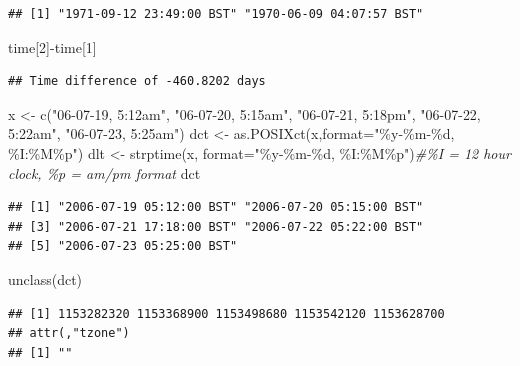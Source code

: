 \documentclass[]{article}
\newenvironment{Shaded}{\begin{snugshade}}{\end{snugshade}}
\newcommand{\AttributeTok}[1]{\textcolor[rgb]{0.77,0.63,0.00}{#1}}
\newcommand{\CommentTok}[1]{\textcolor[rgb]{0.56,0.35,0.01}{\textit{#1}}}
\newcommand{\DecValTok}[1]{\textcolor[rgb]{0.00,0.00,0.81}{#1}}
\newcommand{\FunctionTok}[1]{\textcolor[rgb]{0.00,0.00,0.00}{#1}}
\newcommand{\NormalTok}[1]{#1}
\newcommand{\OtherTok}[1]{\textcolor[rgb]{0.56,0.35,0.01}{#1}}
\newcommand{\SpecialCharTok}[1]{\textcolor[rgb]{0.00,0.00,0.00}{#1}}
\newcommand{\StringTok}[1]{\textcolor[rgb]{0.31,0.60,0.02}{#1}}
\begin{document}
\begin{verbatim}
## [1] "1971-09-12 23:49:00 BST" "1970-06-09 04:07:57 BST"
\end{verbatim}

\begin{Shaded}
\begin{Highlighting}[]
\NormalTok{time[}\DecValTok{2}\NormalTok{]}\SpecialCharTok{{-}}\NormalTok{time[}\DecValTok{1}\NormalTok{]}
\end{Highlighting}
\end{Shaded}

\begin{verbatim}
## Time difference of -460.8202 days
\end{verbatim}

\begin{Shaded}
\begin{Highlighting}[]
\NormalTok{x }\OtherTok{\textless{}{-}} \FunctionTok{c}\NormalTok{(}\StringTok{"06{-}07{-}19, 5:12am"}\NormalTok{, }\StringTok{"06{-}07{-}20, 5:15am"}\NormalTok{, }\StringTok{"06{-}07{-}21, 5:18pm"}\NormalTok{, }\StringTok{"06{-}07{-}22, 5:22am"}\NormalTok{,  }\StringTok{"06{-}07{-}23, 5:25am"}\NormalTok{)}
\NormalTok{dct }\OtherTok{\textless{}{-}} \FunctionTok{as.POSIXct}\NormalTok{(x,}\AttributeTok{format=}\StringTok{"\%y{-}\%m{-}\%d, \%I:\%M\%p"}\NormalTok{)}
\NormalTok{dlt }\OtherTok{\textless{}{-}} \FunctionTok{strptime}\NormalTok{(x, }\AttributeTok{format=}\StringTok{"\%y{-}\%m{-}\%d, \%I:\%M\%p"}\NormalTok{)}\CommentTok{\#\%I = 12 hour clock, \%p = am/pm format}
\NormalTok{dct}
\end{Highlighting}
\end{Shaded}

\begin{verbatim}
## [1] "2006-07-19 05:12:00 BST" "2006-07-20 05:15:00 BST"
## [3] "2006-07-21 17:18:00 BST" "2006-07-22 05:22:00 BST"
## [5] "2006-07-23 05:25:00 BST"
\end{verbatim}

\begin{Shaded}
\begin{Highlighting}[]
\FunctionTok{unclass}\NormalTok{(dct)}
\end{Highlighting}
\end{Shaded}

\begin{verbatim}
## [1] 1153282320 1153368900 1153498680 1153542120 1153628700
## attr(,"tzone")
## [1] ""
\end{verbatim}
\end{document}
